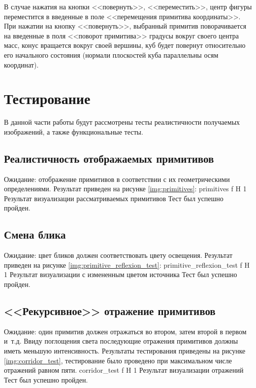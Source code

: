 В случае нажатия  на кнопки <<повернуть>>, <<переместить>>,
центр фигуры переместится в введенные в поле <<перемещения примитива координаты>>. При нажатии на кнопку <<повернуть>>, выбранный примитив
поворачивается на введенные в поля <<поворот примитива>> градусы вокруг своего центра масс, конус вращается вокруг своей вершины, куб будет повернут относительно его начального состояния (нормали плоскостей куба параллельны осям координат).

\section{Тестирование}
В данной части работы будут рассмотрены тесты реалистичности получаемых изображений, а также функциональные тесты.

\subsection{Реалистичность отображаемых примитивов}
Ожидание: отображение примитивов  в соответствии с их геометрическими определениями.
Результат приведен на рисунке \ref{img:primitives}:
{primitives} %
{f} %
{H} %
{1\textwidth} %
{Результат визуализации рассматриваемых примитивов} %
Тест был успешно пройден.

\subsection{Смена блика}
Ожидание: цвет бликов должен соответствовать цвету освещения.
Результат приведен на рисунке \ref{img:primitive_reflexion_test}:
{primitive_reflexion_test} %
{f} %
{H} %
{1\textwidth} %
{Результат визуализации с измененным цветом источника} %
Тест был успешно пройден.

\subsection{<<Рекурсивное>> отражение примитивов}
Ожидание: один примитив должен отражаться во втором, затем второй в первом и~т.д. Ввиду поглощения света последующие отражения примитивов должны иметь меньшую интенсивность. Результаты тестирования приведены на рисунке \ref{img:corridor_test}, тестирование было проведено при максимальном числе отражений равном пяти.
{corridor_test} %
{f} %
{H} %
{1\textwidth} %
{Результат визуализации отражений} %
Тест был успешно пройден.

